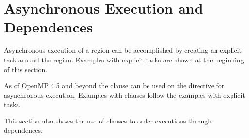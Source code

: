 \section{Asynchronous  Execution and Dependences}
\label{sec:async_target_exec_depend}

Asynchronous execution of a  region can be accomplished
by creating an explicit task around the  region. Examples
with explicit tasks are shown at the beginning of this section. 

As of OpenMP 4.5 and beyond the  clause can be used on the
 directive for asynchronous execution. Examples with 
 clauses follow the examples with explicit tasks.

This section also shows the use of  clauses to order 
executions through dependences.

